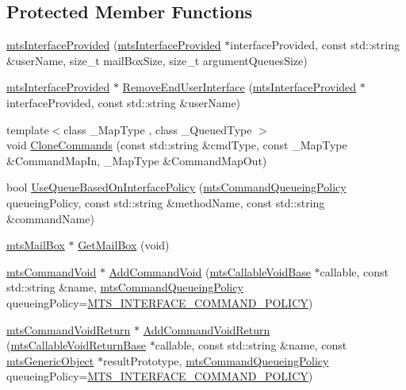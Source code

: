 \subsection*{Protected Member Functions}
\begin{DoxyCompactItemize}
\item 
\hyperlink{classmts_interface_provided_aae817ee7252b13bcae68eb8cc414cb51}{mts\-Interface\-Provided} (\hyperlink{classmts_interface_provided}{mts\-Interface\-Provided} $\ast$interface\-Provided, const std\-::string \&user\-Name, size\-\_\-t mail\-Box\-Size, size\-\_\-t argument\-Queues\-Size)
\item 
\hyperlink{classmts_interface_provided}{mts\-Interface\-Provided} $\ast$ \hyperlink{classmts_interface_provided_a18304c0f5cb76444473eaf8b018fe471}{Remove\-End\-User\-Interface} (\hyperlink{classmts_interface_provided}{mts\-Interface\-Provided} $\ast$interface\-Provided, const std\-::string \&user\-Name)
\item 
{\footnotesize template$<$class \-\_\-\-Map\-Type , class \-\_\-\-Queued\-Type $>$ }\\void \hyperlink{classmts_interface_provided_a49bdd7b3dc270b5622e9579ece4b5589}{Clone\-Commands} (const std\-::string \&cmd\-Type, const \-\_\-\-Map\-Type \&Command\-Map\-In, \-\_\-\-Map\-Type \&Command\-Map\-Out)
\item 
bool \hyperlink{classmts_interface_provided_a6fb18b9649748be4f388ef19f11ceeb3}{Use\-Queue\-Based\-On\-Interface\-Policy} (\hyperlink{mts_forward_declarations_8h_aa2ac24035e136fa1689dcc2854c63fc7}{mts\-Command\-Queueing\-Policy} queueing\-Policy, const std\-::string \&method\-Name, const std\-::string \&command\-Name)
\item 
\hyperlink{classmts_mail_box}{mts\-Mail\-Box} $\ast$ \hyperlink{classmts_interface_provided_a1991a4296807d19fa5d5d55d02f2c45f}{Get\-Mail\-Box} (void)
\item 
\hyperlink{classmts_command_void}{mts\-Command\-Void} $\ast$ \hyperlink{classmts_interface_provided_a902d9dc8912c02325c40a40c318fc12d}{Add\-Command\-Void} (\hyperlink{classmts_callable_void_base}{mts\-Callable\-Void\-Base} $\ast$callable, const std\-::string \&name, \hyperlink{mts_forward_declarations_8h_aa2ac24035e136fa1689dcc2854c63fc7}{mts\-Command\-Queueing\-Policy} queueing\-Policy=\hyperlink{mts_forward_declarations_8h_aa2ac24035e136fa1689dcc2854c63fc7a4f444b4120a5e2efd084e2e5a214f5c8}{M\-T\-S\-\_\-\-I\-N\-T\-E\-R\-F\-A\-C\-E\-\_\-\-C\-O\-M\-M\-A\-N\-D\-\_\-\-P\-O\-L\-I\-C\-Y})
\item 
\hyperlink{classmts_command_void_return}{mts\-Command\-Void\-Return} $\ast$ \hyperlink{classmts_interface_provided_ab0984ae6d18a845940269f727833000f}{Add\-Command\-Void\-Return} (\hyperlink{classmts_callable_void_return_base}{mts\-Callable\-Void\-Return\-Base} $\ast$callable, const std\-::string \&name, const \hyperlink{classmts_generic_object}{mts\-Generic\-Object} $\ast$result\-Prototype, \hyperlink{mts_forward_declarations_8h_aa2ac24035e136fa1689dcc2854c63fc7}{mts\-Command\-Queueing\-Policy} queueing\-Policy=\hyperlink{mts_forward_declarations_8h_aa2ac24035e136fa1689dcc2854c63fc7a4f444b4120a5e2efd084e2e5a214f5c8}{M\-T\-S\-\_\-\-I\-N\-T\-E\-R\-F\-A\-C\-E\-\_\-\-C\-O\-M\-M\-A\-N\-D\-\_\-\-P\-O\-L\-I\-C\-Y})

\end{DoxyCompactItemize}
